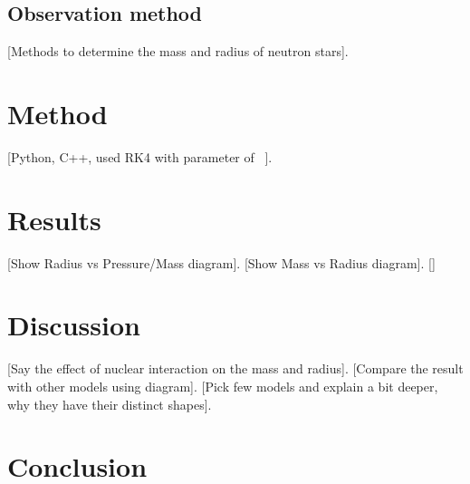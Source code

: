 \documentclass[11pt]{article}
\begin{document}
\subsection{Observation method}
[Methods to determine the mass and radius of neutron stars].

\section{Method}
[Python, C++, used RK4 with parameter of ~].


\section{Results}
[Show Radius vs Pressure/Mass diagram]. [Show Mass vs Radius diagram]. []

\section{Discussion}
[Say the effect of nuclear interaction on the mass and radius]. [Compare the result with other models using diagram]. [Pick few models and explain a bit deeper, why they have their distinct shapes].

\section{Conclusion}

%
\end{document}

